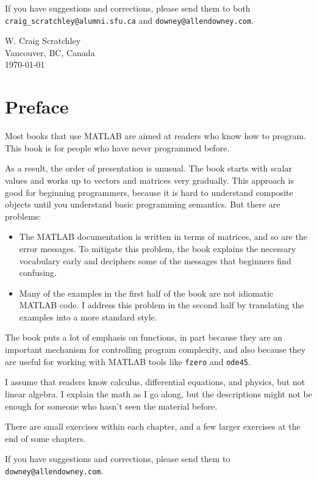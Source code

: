 \documentclass{book}
\begin{document}
If you have suggestions and corrections, please send them to both
{\tt craig\_scratchley@alumni.sfu.ca} and {\tt downey@allendowney.com}.

\noindent W. Craig Scratchley \\
\noindent Vancouver, BC, Canada \\
\newline
\today

\chapter{Preface}
Most books that use MATLAB are aimed at readers who know how
to program.  This book is for people who have never programmed
before.

As a result, the order of presentation is unusual.  The book starts
with scalar values and works up to vectors and matrices very
gradually.  This approach is good for beginning programmers, because
it is hard to understand composite objects until you understand basic
programming semantics.  But there are problems:

\begin{itemize}

\item The MATLAB documentation is written in terms of matrices,
and so are the error messages.
To mitigate this problem, the book explains the necessary
vocabulary early and deciphers some of the messages that
beginners find confusing.

\item Many of the examples in the first half of the book are
not idiomatic MATLAB code.  I address this problem in the second
half by translating the examples into a more standard style.

\end{itemize}

The book puts a lot of emphasis on functions, in part because they are
an important mechanism for controlling program complexity, and also
because they are useful for working with MATLAB tools like {\tt fzero}
and {\tt ode45}.

I assume that readers know calculus, differential equations, and
physics, but not linear algebra.  I explain the math as I go along,
but the descriptions might not be enough for someone who hasn't seen
the material before.

There are small exercises within each chapter, and a few larger
exercises at the end of some chapters.

If you have suggestions and corrections, please send them to
{\tt downey@allendowney.com}.
\end{document}
